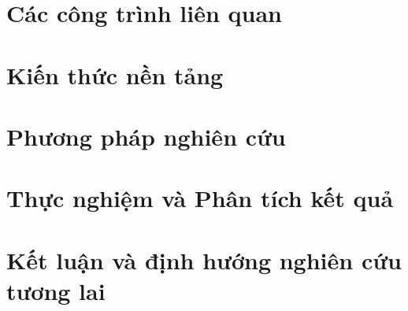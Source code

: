 \documentclass[12pt, a4paper]{article}
\begin{document}
\section{Các công trình liên quan}
\section{Kiến thức nền tảng}
\section{Phương pháp nghiên cứu}
\section{Thực nghiệm và Phân tích kết quả}
\section{Kết luận và định hướng nghiên cứu tương lai}
\end{document}
